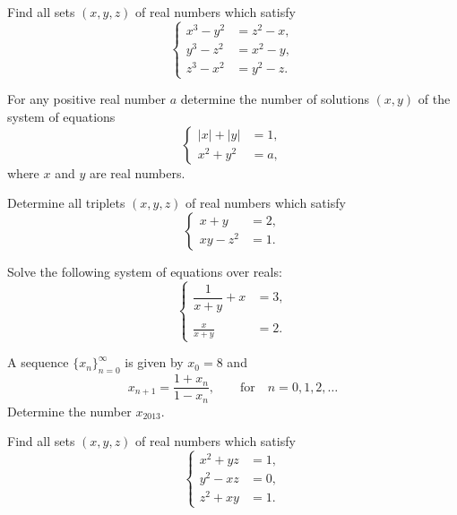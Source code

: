 \documentclass[12pt,a4paper]{memoir}
\theoremstyle{definition}
\begin{document}
\begin{question}[name={2004 Denmark (Georg Mohr)}]
	Find all sets $(x,y,z)$ of real numbers which satisfy
	\[\begin{cases}
		x^3 - y^2 &= z^2 -x, \\ y^3 - z^2 &= x^2 - y,\\ z^3 - x^2 &= y^2 - z.
	\end{cases}\]
\end{question}



\begin{question}[name={2005 Denmark (Georg Mohr)}]
	For any positive real number $a$ determine the number of solutions $(x,y)$ of the system of equations
	\[\begin{cases}
		|x| + |y| &= 1, \\ x^2 + y^2 &= a,
	\end{cases}\]
	where $x$ and $y$ are real numbers.
\end{question}



\begin{question}[name={2006 Denmark (Georg Mohr)}]
	Determine all triplets $(x,y,z)$ of real numbers which satisfy
	\[\begin{cases}
		x+y &= 2, \\ xy - z^2 &= 1.
	\end{cases}\]
\end{question}



\begin{question}[name={2009 Denmark (Georg Mohr)}]
	Solve the following system of equations over reals:
	\[\begin{cases}
		\dfrac{1}{x+y} + x &= 3, \\ & \\  \displaystyle \frac{x}{x+y} &= 2.
	\end{cases}\]
\end{question}


\begin{question}[name={2013 Denmark (Georg Mohr)}]
	A sequence $\{x_n\}_{n=0}^{\infty}$ is given by $x_0=8$ and
	\[x_{n+1} = \frac{1+x_n}{1-x_n},\qquad \text{for} \quad n=0,1,2,\dots\]
	Determine the number $x_{2013}$.
\end{question}


\begin{question}[name={2015 Denmark (Georg Mohr)}]
	Find all sets $(x,y,z)$ of real numbers which satisfy
	\[\begin{cases}
		x^2 + yz &= 1, \\ y^2 - xz &= 0,\\ z^2 + xy &= 1.
	\end{cases}\]
\end{question}
\end{document}
